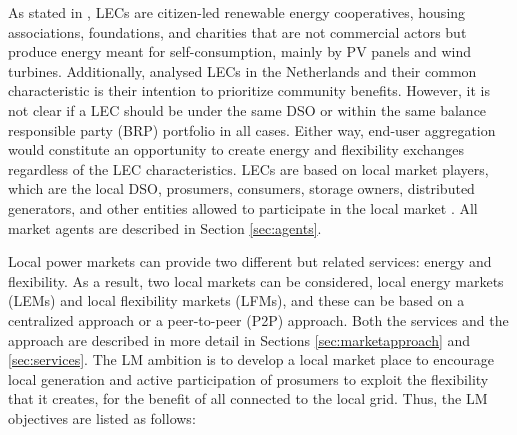 As stated in \cite{sajn2016electricity}, LECs are citizen-led renewable energy cooperatives, housing associations, foundations, and charities that are not commercial actors but produce energy meant for self-consumption, mainly by PV panels and wind turbines. Additionally, \cite{van2015power} analysed LECs in the Netherlands and their common characteristic is their intention to prioritize community benefits. However, it is not clear if a LEC should be under the same DSO or within the same balance responsible party (BRP) portfolio in all cases. Either way, end-user aggregation would constitute an opportunity to create energy and flexibility exchanges regardless of the LEC characteristics. LECs are based on local market players, which are the local DSO, prosumers, consumers, storage owners, distributed generators, and other entities allowed to participate in the local market \cite{faber2014micro}. All market agents are described in Section \ref{sec:agents}.

Local power markets can provide two different but related services: energy and flexibility. As a result, two local markets can be considered, local energy markets (LEMs) and local flexibility markets (LFMs), and these can be based on a centralized approach or a peer-to-peer (P2P) approach. Both the services and the approach are described in more detail in Sections \ref{sec:marketapproach} and \ref{sec:services}. The LM ambition is to develop a local market place to encourage local generation and active participation of prosumers to exploit the flexibility that it creates, for the benefit of all connected to the local grid. Thus, the LM objectives are listed as follows:

